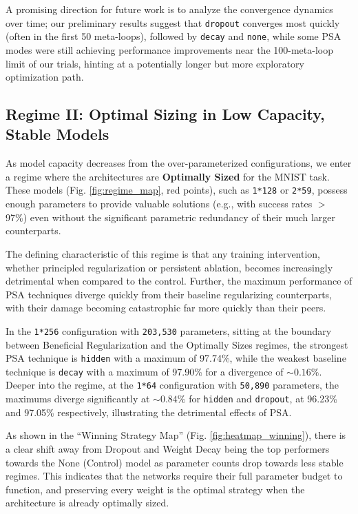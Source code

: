 \documentclass[conference]{IEEEtran}
\begin{document}
A promising direction for future work is to analyze the convergence dynamics over time; our preliminary results suggest that \verb|dropout| converges most quickly (often in the first 50 meta-loops), followed by \verb|decay| and \verb|none|, while some PSA modes were still achieving performance improvements near the 100-meta-loop limit of our trials, hinting at a potentially longer but more exploratory optimization path.

\subsection{Regime II: Optimal Sizing in Low Capacity, Stable Models}

As model capacity decreases from the over-parameterized configurations, we enter a regime where the architectures are \textbf{Optimally Sized} for the MNIST task. These models (Fig. \ref{fig:regime_map}, red points), such as \texttt{1*128} or \texttt{2*59}, possess enough parameters to provide valuable solutions (e.g., with success rates $>$ 97\%) even without the significant parametric redundancy of their much larger counterparts.

The defining characteristic of this regime is that any training intervention, whether principled regularization or persistent ablation, becomes increasingly detrimental when compared to the control. Further, the maximum performance of PSA techniques diverge quickly from their baseline regularizing counterparts, with their damage becoming catastrophic far more quickly than their peers. 

In the \verb|1*256| configuration with \verb|203,530| parameters, sitting at the boundary between Beneficial Regularization and the Optimally Sizes regimes, the strongest PSA technique is \verb|hidden| with a maximum of 97.74\%, while the weakest baseline technique is \verb|decay| with a maximum of 97.90\% for a divergence of $\sim0.16\%$. Deeper into the regime, at the \verb|1*64| configuration with \verb|50,890| parameters, the maximums diverge significantly at $\sim0.84\%$ for \verb|hidden| and \verb|dropout|, at 96.23\% and 97.05\% respectively, illustrating the detrimental effects of PSA.

As shown in the ``Winning Strategy Map'' (Fig. \ref{fig:heatmap_winning}), there is a clear shift away from Dropout and Weight Decay being the top performers towards the None (Control) model as parameter counts drop towards less stable regimes. This indicates that the networks require their full parameter budget to function, and preserving every weight is the optimal strategy when the architecture is already optimally sized.
\end{document}
